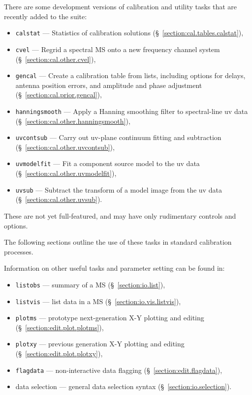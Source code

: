 There are some development versions of calibration and utility
tasks that are recently added to the suite:
\begin{itemize}
   \item {\tt calstat} --- Statistics of calibration solutions 
      (\S~\ref{section:cal.tables.calstat}),
   \item {\tt cvel} --- Regrid a spectral MS onto a new frequency
      channel system
      (\S~\ref{section:cal.other.cvel}),
   \item {\tt gencal} --- Create a calibration table from lists,
      including options for delays, antenna position errors, and 
      amplitude and phase adjustment
      (\S~\ref{section:cal.prior.gencal}),
   \item {\tt hanningsmooth} --- Apply a Hanning smoothing filter to
      spectral-line uv data
      (\S~\ref{section:cal.other.hanningsmooth}),
   \item {\tt uvcontsub} --- Carry out uv-plane continuum fitting and subtraction 
      (\S~\ref{section:cal.other.uvcontsub}),
   \item {\tt uvmodelfit} --- Fit a component source model to
     the uv data (\S~\ref{section:cal.other.uvmodelfit}),
   \item {\tt uvsub} --- Subtract the transform of a model image from
     the uv data (\S~\ref{section:cal.other.uvsub}).
\end{itemize}
These are not yet full-featured, and may have only rudimentary
controls and options.

The following sections outline the use of these tasks in standard calibration
processes.

Information on other useful tasks and parameter setting can be found in:
\begin{itemize}
   \item {\tt listobs} --- summary of a MS (\S~\ref{section:io.list}),
   \item {\tt listvis} --- list data in a MS (\S~\ref{section:io.vis.listvis}),
   \item {\tt plotms} --- prototype next-generation X-Y plotting and editing 
      (\S~\ref{section:edit.plot.plotms}),
   \item {\tt plotxy} --- previous generation X-Y plotting and editing 
      (\S~\ref{section:edit.plot.plotxy}),
   \item {\tt flagdata} --- non-interactive data flagging
      (\S~\ref{section:edit.flagdata}),
   \item data selection --- general data selection syntax
      (\S~\ref{section:io.selection}).
\end{itemize}

